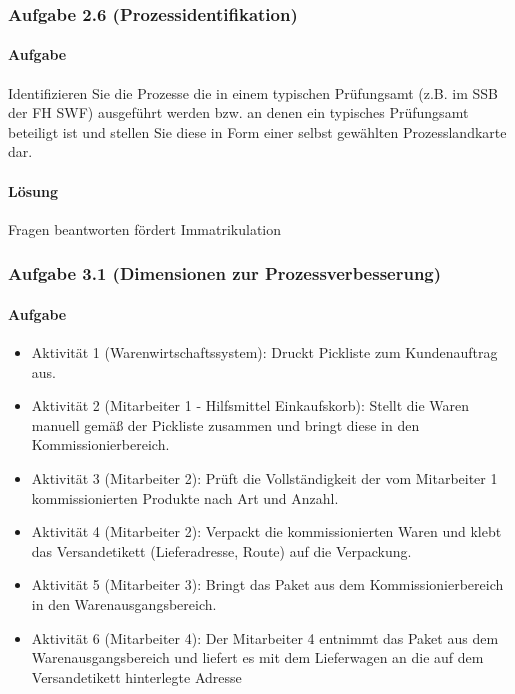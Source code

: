\subsubsection*{Aufgabe 2.6 (Prozessidentifikation)}
\paragraph*{Aufgabe}
    Identifizieren Sie die Prozesse die in einem typischen Prüfungsamt (z.B. im SSB der FH SWF) ausgeführt werden bzw. an denen ein typisches Prüfungsamt beteiligt ist und stellen Sie diese in Form einer selbst gewählten Prozesslandkarte dar.
   
\paragraph*{Lösung}
    Fragen beantworten \textrightarrow fördert \textrightarrow Immatrikulation


\subsubsection*{Aufgabe 3.1 (Dimensionen zur Prozessverbesserung)}
\paragraph*{Aufgabe}
    \begin{itemize}
        \item Aktivität 1 (Warenwirtschaftssystem): Druckt Pickliste zum Kundenauftrag aus.
        \item Aktivität 2 (Mitarbeiter 1 - Hilfsmittel Einkaufskorb): Stellt die Waren manuell gemäß der Pickliste zusammen und bringt diese in den Kommissionierbereich.
        \item Aktivität 3 (Mitarbeiter 2): Prüft die Vollständigkeit der vom Mitarbeiter 1 kommissionierten Produkte nach Art und Anzahl.
        \item Aktivität 4 (Mitarbeiter 2): Verpackt die kommissionierten Waren und klebt das Versandetikett (Lieferadresse, Route) auf die Verpackung.
        \item Aktivität 5 (Mitarbeiter 3): Bringt das Paket aus dem Kommissionierbereich in den Warenausgangsbereich.
        \item Aktivität 6 (Mitarbeiter 4): Der Mitarbeiter 4 entnimmt das Paket aus dem Warenausgangsbereich und liefert es mit dem Lieferwagen an die auf dem Versandetikett hinterlegte Adresse
    \end{itemize}


